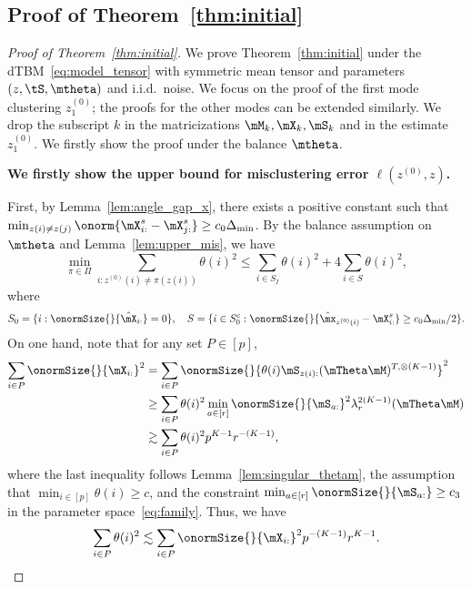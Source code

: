 \documentclass[lettersize,onecolumn,journal]{IEEEtran}
\theoremstyle{definition}
\theoremstyle{definition}
\begin{document}
\subsection{Proof of Theorem~\ref{thm:initial}}
\begin{proof}[Proof of Theorem~\ref{thm:initial}] We prove Theorem~\ref{thm:initial} under the dTBM~\eqref{eq:model_tensor} with symmetric mean tensor and parameters $(z, \tS, \mtheta)$ and i.i.d.\ noise. We focus on the proof of the first mode clustering $z^{(0)}_1$; the proofs for the other modes can be extended similarly. We drop the subscript $k$ in the matricizations $\mM_k, \mX_k, \mS_k$ and in the estimate $z^{(0)}_1$. We firstly show the proof under the balance $\mtheta$.

\textbf{We firstly show the upper bound for misclustering error $\ell(z^{(0)}, z)$.}

First, by Lemma~\ref{lem:angle_gap_x}, there exists a positive constant such that $\min_{z(i) \neq z(j)} \onorm{ \mX^s_{i:} - \mX^s_{j:} } \geq c_0  \Delta_{\min}$. By the balance assumption on $\mtheta$ and Lemma~\ref{lem:upper_mis}, we have 
 \begin{equation}\label{eq:theta_bound}
          \min_{\pi \in \Pi} \sum_{i : z^{(0)}(i) \neq \pi(z(i))} \theta(i)^2  \leq  \sum_{i \in S_I} \theta(i)^2 + 4 \sum_{i \in S} \theta(i)^2 ,
    \end{equation}
    where 
    \begin{equation}
        S_0 = \{i: \onormSize{}{\hat \mX_{i:}} = 0\}, \quad S = \{i \in S_0^c: \onormSize{}{\hat \mx_{z^{(0)}(i)} - \mX_{i:}^s } \geq c_0  \Delta_{\min}/2\}.
    \end{equation}
    On one hand, note that for any set $P \in [p]$,
    \begin{align}
        \sum_{i \in P} \onormSize{}{\mX_{i:}}^2 &= \sum_{i \in P} \onormSize{}{ \theta(i) \mS_{z(i):} (\mTheta \mM)^{T, \otimes (K-1)} }^2 \\
        & \geq \sum_{i \in P} \theta(i)^2 \min_{a \in [r]} \onormSize{}{\mS_{a:}}^2 \lambda_{r}^{2(K-1)} (\mTheta \mM)\\
        & \gtrsim \sum_{i \in P} \theta(i)^2 p^{K-1} r^{-(K-1)}, 
    \end{align}
    where the last inequality follows Lemma~\ref{lem:singular_thetam}, the assumption that $\min_{i \in [p]} \theta(i) \geq c$, and the constraint $\min_{a \in [r]} \onormSize{}{\mS_{a:}} \geq c_3$ in the parameter space~\eqref{eq:family}. Thus, we have 
    \begin{equation}\label{eq:theta_p}
        \sum_{i \in P} \theta(i)^2 \lesssim \sum_{i \in P} \onormSize{}{\mX_{i:}}^2 p^{-(K-1)} r^{K-1}.
    \end{equation}
    

\end{proof}
\end{document}
